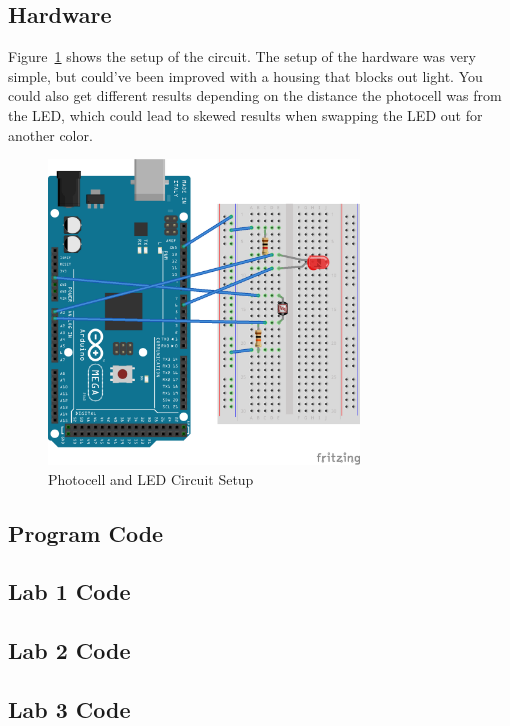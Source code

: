 \documentclass[12pt,titlepage]{article}
\begin{document}
\subsection{Hardware}
Figure~\ref{fig:lab_3_schem} shows the setup of the circuit. The setup of the hardware was very simple, but
could've been improved with a housing that blocks out light. You could also get different results depending
on the distance the photocell was from the LED, which could lead to skewed results when swapping the LED out
for another color.
\begin{figure}[!htb]
    \centering
    \includegraphics[width=3.25in]{lab_3/schematic.png}
    \caption{Photocell and LED Circuit Setup}\label{fig:lab_3_schem}
\end{figure}
\clearpage
\begin{appendices}
  \section{Program Code}
  \subsection{Lab 1 Code}
  \begin{minipage}{\linewidth}
    
  \end{minipage} 
  \subsection{Lab 2 Code}
    
  \subsection{Lab 3 Code}
    
\end{appendices}
\end{document}
